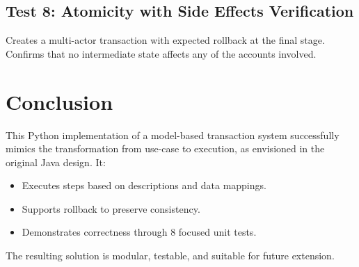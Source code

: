 \documentclass[a4paper,12pt]{article}
\begin{document}
\subsection*{Test 8: Atomicity with Side Effects Verification}
Creates a multi-actor transaction with expected rollback at the final stage. Confirms that no intermediate state affects any of the accounts involved.
\section*{Conclusion}

This Python implementation of a model-based transaction system successfully mimics the transformation from use-case to execution, as envisioned in the original Java design. It:

\begin{itemize}
  \item Executes steps based on descriptions and data mappings.
  \item Supports rollback to preserve consistency.
  \item Demonstrates correctness through 8 focused unit tests.
\end{itemize}

The resulting solution is modular, testable, and suitable for future extension.
\end{document}
